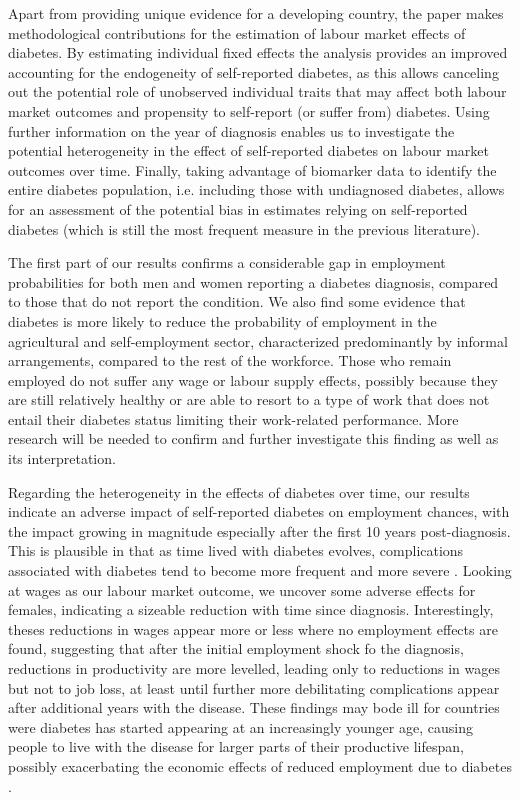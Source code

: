 Apart from providing unique evidence for a developing country, the paper makes methodological contributions for the estimation of labour market effects of diabetes. By estimating individual fixed effects the analysis provides an improved accounting for the endogeneity of self-reported diabetes, as this allows canceling out the potential role of unobserved individual traits that may affect both labour market outcomes and propensity to self-report (or suffer from) diabetes. Using further information on the year of diagnosis enables us to investigate the potential heterogeneity in the effect of self-reported diabetes on labour market outcomes over time. Finally, taking advantage of biomarker data to identify the entire diabetes population, i.e. including those with undiagnosed diabetes, allows for an assessment of the potential bias in estimates relying on self-reported diabetes (which is still the most frequent measure in the previous literature).

The first part of our results confirms a considerable gap in employment probabilities for both men and women reporting a diabetes diagnosis, compared to those that do not report the condition. We also find some evidence that diabetes is more likely to reduce the probability of employment in the agricultural and self-employment sector, characterized predominantly by informal arrangements, compared to the rest of the workforce. Those who remain employed do not suffer any wage or labour supply effects, possibly because they are still relatively healthy or are able to resort to a type of work that does not entail their diabetes status limiting their work-related performance. More research will be needed to confirm and further investigate this finding as well as its interpretation. 

Regarding the heterogeneity in the effects of diabetes over time, our results indicate an adverse impact of self-reported diabetes on employment chances, with the impact growing in magnitude especially after the first 10 years post-diagnosis. This is plausible in that as time lived with diabetes evolves, complications associated with diabetes tend to become more frequent and more severe \parencite{Adler2003}. Looking at wages as our labour market outcome, we uncover some adverse effects for females, indicating a sizeable reduction with time since diagnosis. Interestingly, theses reductions in wages appear more or less where no employment effects are found, suggesting that after the initial employment shock fo the diagnosis, reductions in productivity are more levelled, leading only to reductions in wages but not to job loss, at least until further more debilitating complications appear after additional years with the disease.  These findings may bode ill for countries were diabetes has started appearing at an increasingly younger age, causing people to live with the disease for larger parts of their productive lifespan, possibly exacerbating the economic effects of reduced employment due to diabetes \parencite{Hu2011,Villalpando2010}.

